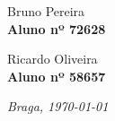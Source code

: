 \begin{titlepage}
\begin{center}
{\vfill
\begin{minipage}{0.4\textwidth}
	\begin{flushleft} 
		\large
	Bruno Pereira\\
\textbf{Aluno nº 72628} 
	\end{flushleft}

\end{minipage}
\begin{minipage}{0.4\textwidth}
	\begin{flushright} 
		\large
	Ricardo Oliveira\\
\textbf{Aluno nº 58657} 
	\end{flushright}
\end{minipage}

\vfill



\vfill

\emph{\large Braga, {\large \today}}
}
\end{center}

\end{titlepage}
